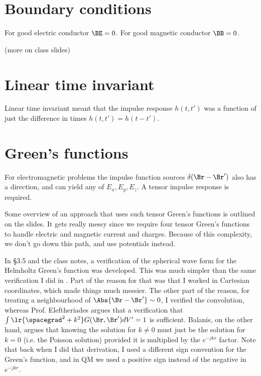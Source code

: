 \section{Boundary conditions}
%
For good electric conductor \( \BE = 0 \).
For good magnetic conductor \( \BB = 0 \).

(more on class slides)

\section{Linear time invariant}
%
Linear time invariant meant that the impulse response \( h(t,t') \) was a function of just the difference in times \( h(t,t') = h(t-t') \).
%
\section{Green's functions}
%
For electromagnetic problems the impulse function sources \( \delta(\Br - \Br') \) also has a direction, and can yield any of \( E_x, E_y, E_z \).  A tensor impulse response is required.

Some overview of an approach that uses such tensor Green's functions is outlined on the slides.  It gets really messy since we require four tensor Green's functions to handle electric and magnetic current and charges.  Because of this complexity, we don't go down this path, and use potentials instead.

In \S 3.5 \citep{balanis2005antenna} and the class notes, a verification of the spherical wave form for the Helmholtz Green's function was developed.  This was much simpler than the same verification I did in \citep{phy456:helmoltzGreens}.  Part of the reason for that was that I worked in Cartesian coordinates, which made things much messier.  The other part of the reason, for treating a neighbourhood of \( \Abs{\Br - \Br'} \sim 0 \), I verified the convolution, whereas Prof. Eleftheriades argues that a verification that \( \int \lr{\spacegrad^2 + k^2} G(\Br, \Br') dV' = 1\) is sufficient.  Balanis, on the other hand, argues that knowing the solution for \( k \ne 0 \) must just be the solution for \( k = 0 \) (i.e. the Poisson solution) provided it is multiplied by the \( e^{-j k r} \) factor.
%
Note that back when I did that derivation, I used a different sign convention for the Green's function, and in QM we used a positive sign instead of the negative in \( e^{-j k r } \).

%
%

